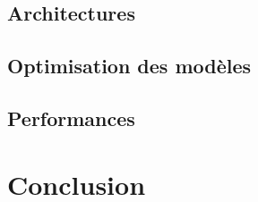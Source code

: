 \documentclass{report}
\begin{document}
	\section{Architectures}
		
		
	\section{Optimisation des modèles}
		
		
	\section{Performances}
		




\chapter{Conclusion}
	
	

\addappheadtotoc
\appendixpage

\appendix
\end{document}
